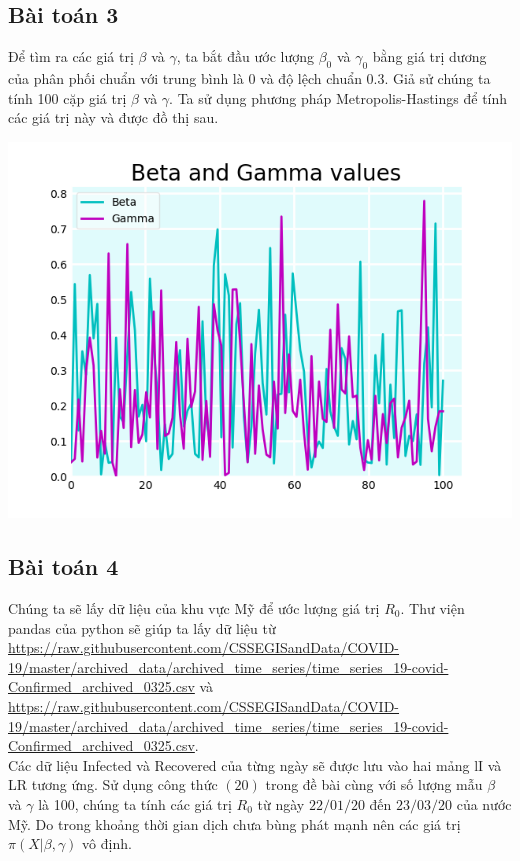 \documentclass[a4paper]{article}
\begin{document}
\subsection{Bài toán 3}	
Để tìm ra các giá trị $\beta$ và $\gamma$, ta bắt đầu ước lượng $\beta_0$ và $\gamma_0$ bằng giá trị dương của phân phối chuẩn với trung bình là 0 và độ lệch chuẩn 0.3. Giả sử chúng ta tính  100 cặp giá trị $\beta$ và $\gamma$. Ta sử dụng phương pháp Metropolis-Hastings để tính các giá trị này và được đồ thị sau.
\begin{center}
\includegraphics[scale=0.8]{Images/Figure_2.png}
\end{center}
\subsection{Bài toán 4}
Chúng ta sẽ lấy dữ liệu của khu vực Mỹ để ước lượng giá trị $R_0$. Thư viện pandas của python sẽ giúp ta lấy dữ liệu từ \url{https://raw.githubusercontent.com/CSSEGISandData/COVID-19/master/archived_data/archived_time_series/time_series_19-covid-Confirmed_archived_0325.csv} và \url{https://raw.githubusercontent.com/CSSEGISandData/COVID-19/master/archived_data/archived_time_series/time_series_19-covid-Confirmed_archived_0325.csv}. \\
Các dữ liệu Infected và Recovered của từng ngày sẽ được lưu vào hai mảng lI và LR tương ứng. Sử dụng công thức $(20)$ trong đề bài cùng với số lượng mẫu $\beta$ và $\gamma$ là 100, chúng ta tính các giá trị $R_0$ từ ngày $22/01/20$ đến $23/03/20$ của nước Mỹ. Do trong khoảng thời gian dịch chưa bùng phát mạnh nên các giá trị $\pi(X|\beta,\gamma)$ vô định.
\end{document}
